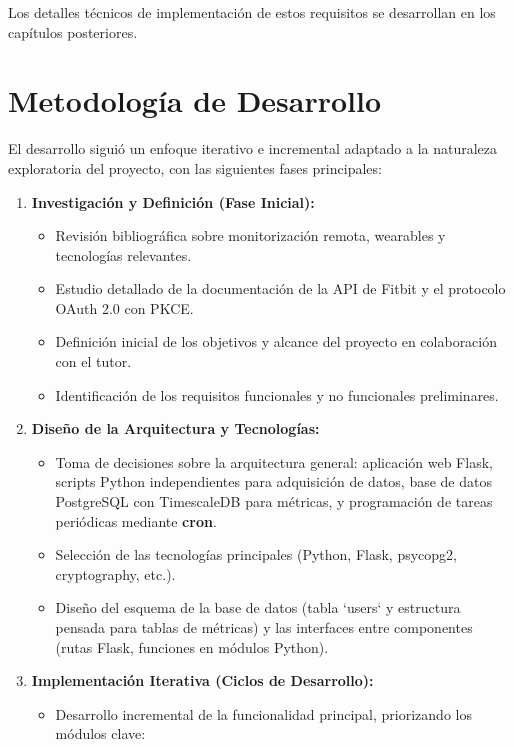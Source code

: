 Los detalles técnicos de implementación de estos requisitos se desarrollan en los capítulos posteriores.

\section{Metodología de Desarrollo}
\label{sec:metodologia}

El desarrollo siguió un enfoque iterativo e incremental adaptado a la naturaleza exploratoria del proyecto, con las siguientes fases principales:

\begin{enumerate}
    \item \textbf{Investigación y Definición (Fase Inicial):}
        \begin{itemize}
            \item Revisión bibliográfica sobre monitorización remota, wearables y tecnologías relevantes.
            \item Estudio detallado de la documentación de la API de Fitbit\textsuperscript{\textregistered} y el protocolo OAuth 2.0 con PKCE.
            \item Definición inicial de los objetivos y alcance del proyecto en colaboración con el tutor.
            \item Identificación de los requisitos funcionales y no funcionales preliminares.
        \end{itemize}
    \item \textbf{Diseño de la Arquitectura y Tecnologías:}
        \begin{itemize}
            \item Toma de decisiones sobre la arquitectura general: aplicación web Flask, scripts Python independientes para adquisición de datos, base de datos PostgreSQL con TimescaleDB para métricas, y programación de tareas periódicas mediante \textbf{cron}.
            \item Selección de las tecnologías principales (Python, Flask, psycopg2, cryptography, etc.).
            \item Diseño del esquema de la base de datos (tabla `users` y estructura pensada para tablas de métricas) y las interfaces entre componentes (rutas Flask, funciones en módulos Python).
        \end{itemize}
    \item \textbf{Implementación Iterativa (Ciclos de Desarrollo):}
        \begin{itemize}
            \item Desarrollo incremental de la funcionalidad principal, priorizando los módulos clave:

\end{itemize}
\end{enumerate}
